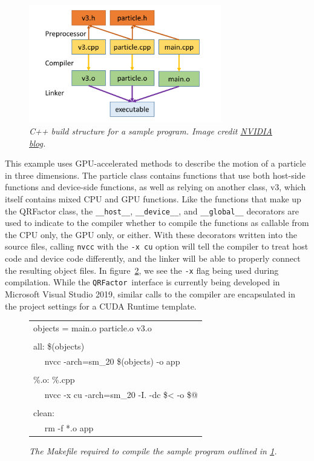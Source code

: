 \documentclass[11pt,letterpaper]{article}
\newcommand{\qrf}{\texttt{QRFactor}}
\begin{document}
\begin{figure}[h]
    \centering
    \includegraphics[width=0.75\textwidth]{C++BuildStructure.png}
    \caption[]{{\it C++ build structure for a sample program. Image credit \href{https://developer.nvidia.com/blog/separate-compilation-linking-cuda-device-code/}{NVIDIA blog}.}}
    \label{f:example}
\end{figure}

This example uses GPU-accelerated methods to describe the motion of a particle in three dimensions. The particle class contains functions that use both host-side functions and device-side functions, as well as relying on another class, v3, which itself contains mixed CPU and GPU functions. Like the functions that make up the QRFactor class, the \verb+__host__+, \verb+__device__+, and \verb+__global__+ decorators are used to indicate to the compiler whether to compile the functions as callable from the CPU only, the GPU only, or either. With these decorators written into the source files, calling \verb+nvcc+ with the \verb+-x cu+ option will tell the compiler to treat host code and device code differently, and the linker will be able to properly connect the resulting object files. In figure~\ref{f:makefile}, we see the \verb+-x+ flag being used during compilation. While the \qrf~interface is currently being developed in Microsoft Visual Studio 2019, similar calls to the compiler are encapsulated in the project settings for a CUDA Runtime template.

\begin{figure}[h]
    \centering
    \begin{tabular}{| p{} |}
        \hline
        objects = main.o particle.o v3.o \\
         \\
        all: \$(objects) \\
        $\quad$ nvcc -arch=sm\_20 \$(objects) -o app \\
         \\
        \%.o: \%.cpp \\
        $\quad$ nvcc -x cu -arch=sm\_20 -I. -dc  \$< -o  \$@ \\
         \\
        clean: \\
        $\quad$ rm -f *.o app \\ \hline
    \end{tabular}
    \caption{{\it The Makefile required to compile the sample program outlined in \ref{f:example}.}}
    \label{f:makefile}
\end{figure}
\end{document}
